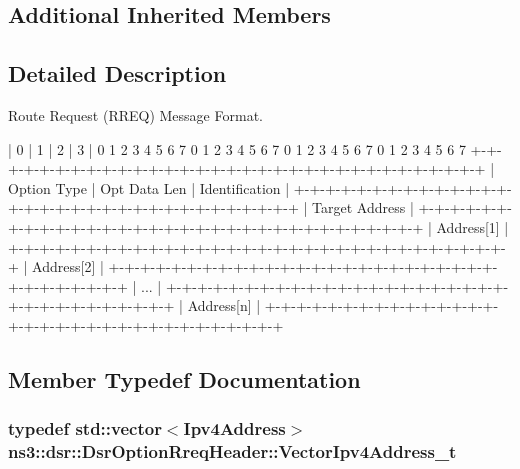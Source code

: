 \subsection*{Additional Inherited Members}


\subsection{Detailed Description}
Route Request (R\+R\+EQ) Message Format. 

\begin{DoxyVerb} |      0        |      1        |      2        |      3        |
 0 1 2 3 4 5 6 7 0 1 2 3 4 5 6 7 0 1 2 3 4 5 6 7 0 1 2 3 4 5 6 7
 +-+-+-+-+-+-+-+-+-+-+-+-+-+-+-+-+-+-+-+-+-+-+-+-+-+-+-+-+-+-+-+-+
 |  Option Type |  Opt Data Len |         Identification         |
 +-+-+-+-+-+-+-+-+-+-+-+-+-+-+-+-+-+-+-+-+-+-+-+-+-+-+-+-+-+-+-+-+
 |                         Target Address                        |
 +-+-+-+-+-+-+-+-+-+-+-+-+-+-+-+-+-+-+-+-+-+-+-+-+-+-+-+-+-+-+-+-+
 |                            Address[1]                         |
 +-+-+-+-+-+-+-+-+-+-+-+-+-+-+-+-+-+-+-+-+-+-+-+-+-+-+-+-+-+-+-+-+
 |                            Address[2]                         |
 +-+-+-+-+-+-+-+-+-+-+-+-+-+-+-+-+-+-+-+-+-+-+-+-+-+-+-+-+-+-+-+-+
 |                               ...                             |
 +-+-+-+-+-+-+-+-+-+-+-+-+-+-+-+-+-+-+-+-+-+-+-+-+-+-+-+-+-+-+-+-+
 |                            Address[n]                         |
 +-+-+-+-+-+-+-+-+-+-+-+-+-+-+-+-+-+-+-+-+-+-+-+-+-+-+-+-+-+-+-+-+
\end{DoxyVerb}
 

\subsection{Member Typedef Documentation}
\subsubsection[{\texorpdfstring{Vector\+Ipv4\+Address\+\_\+t}{VectorIpv4Address_t}}]{\setlength{\rightskip}{0pt plus 5cm}typedef std\+::vector$<${\bf Ipv4\+Address}$>$ {\bf ns3\+::dsr\+::\+Dsr\+Option\+Rreq\+Header\+::\+Vector\+Ipv4\+Address\+\_\+t}\hspace{0.3cm}{\ttfamily [private]}}\hypertarget{classns3_1_1dsr_1_1DsrOptionRreqHeader_a68bb878706d4d36a8d5a36c3f36cb239}{}\label{classns3_1_1dsr_1_1DsrOptionRreqHeader_a68bb878706d4d36a8d5a36c3f36cb239}


